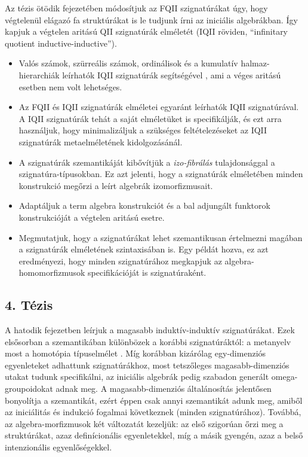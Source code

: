 \documentclass[12pt,a4paper,twosided]{article}
\begin{document}
Az tézis ötödik fejezetében módosítjuk az FQII szignatúrákat úgy, hogy
végtelenül elágazó fa struktúrákat is le tudjunk írni az iniciális
algebrákban. Így kapjuk a végtelen aritású QII szignatúrák elméletét (IQII
röviden, ``infinitary quotient inductive-inductive'').
\begin{itemize}
\item Valós számok, szürreális számok, ordinálisok és a kumulatív halmaz-hierarchiák
  leírhatók IQII szignatúrák segítségével \cite{hottbook}, ami a véges aritású
  esetben nem volt lehetséges.
\item
  Az FQII és IQII szignatúrák elméletei egyaránt leírhatók IQII szignatúrával.
  A IQII szignatúrák tehát a saját elméletüket is specifikálják, és ezt arra használjuk,
  hogy minimalizáljuk a szükséges feltételezéseket az IQII szignatúrák metaelméletének
  kidolgozásánál.
\item
  A szignatúrák szemantikáját kibővítjük a \emph{izo-fibrálás} tulajdonsággal a
  szignatúra-típusokban. Ez azt jelenti, hogy a szignatúrák elméletében minden
  konstrukció megőrzi a leírt algebrák izomorfizmusait.
\item
  Adaptáljuk a term algebra konstrukciót és a bal adjungált funktorok konstrukcióját
  a végtelen aritású esetre.
\item
  Megmutatjuk, hogy a szignatúrákat lehet szemantikusan értelmezni magában a
  szignatúrák elméletének szintaxisában is. Egy példát hozva, ez azt
  eredményezi, hogy minden szignatúrához megkapjuk az algebra-homomorfizmusok
  specifikációját is szignatúraként.
\end{itemize}

\subsection*{4. Tézis}
A hatodik fejezetben leírjuk a magasabb induktív-induktív szignatúrákat. Ezek
elsősorban a szemantikában különbözek a korábbi szignatúráktól: a metanyelv most
a homotópia típuselmélet \cite{hottbook}. Míg korábban kizárólag egy-dimenziós
egyenleteket adhattunk szignatúrákhoz, most tetszőleges magasabb-dimenziós
utakat tudunk specifikálni, az iniciális algebrák pedig szabadon generált
omega-groupoidokat adnak meg. A magasabb-dimenziós általánosítás jelentősen
bonyolítja a szemantikát, ezért éppen csak annyi szemantikát adunk meg, amiből
az iniciálitás és indukció fogalmai következnek (minden szignatúrához). Továbbá,
az algebra-morfizmusok két változatát kezeljük: az első szigorúan őrzi meg a
struktúrákat, azaz definícionális egyenletekkel, míg a másik gyengén, azaz
a belső intenzionális egyenlőségekkel.
\end{document}
